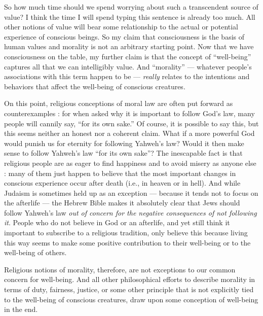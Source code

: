 \documentclass[a4paper,14pt]{extbook}
\begin{document}
So how much time should we spend worrying about such a transcendent source of value?
I think the time I will spend typing this sentence is already too much.
All other notions of value will bear some relationship to the actual or potential experience of conscious beings.
So my claim that consciousness is the basis of human values and morality is not an arbitrary starting point.
Now that we have consciousness on the table, my further claim is that the concept of ``well-being'' captures all that we can intelligibly value.
And ``morality'' --- whatever people's associations with this term happen to be --- \textit{really} relates to the intentions and behaviors that affect the well-being of conscious creatures.

On this point, religious conceptions of moral law are often put forward as counterexamples :
for when asked why it is important to follow God's law, many people will cannily say, ``for its own sake.''
Of course, it is possible to say this, but this seems neither an honest nor a coherent claim.
What if a more powerful God would punish us for eternity for following Yahweh's law?
Would it then make sense to follow Yahweh's law ``for its own sake''?
The inescapable fact is that religious people are as eager to find happiness and to avoid misery as anyone else :
many of them just happen to believe that the most important changes in conscious experience occur after death (i.e., in heaven or in hell).
And while Judaism is sometimes held up as an exception --- because it tends not to focus on the afterlife --- the Hebrew Bible makes it absolutely clear that Jews should follow Yahweh's law \textit{out of concern for the negative consequences of not following it}.
People who do not believe in God or an afterlife, and yet still think it important to subscribe to a religious tradition, only believe this because living this way seems to make some positive contribution to their well-being or to the well-being of others.

Religious notions of morality, therefore, are not exceptions to our common concern for well-being.
And all other philosophical efforts to describe morality in terms of duty, fairness, justice, or some other principle that is not explicitly tied to the well-being of conscious creatures, draw upon some conception of well-being in the end.
\end{document}

